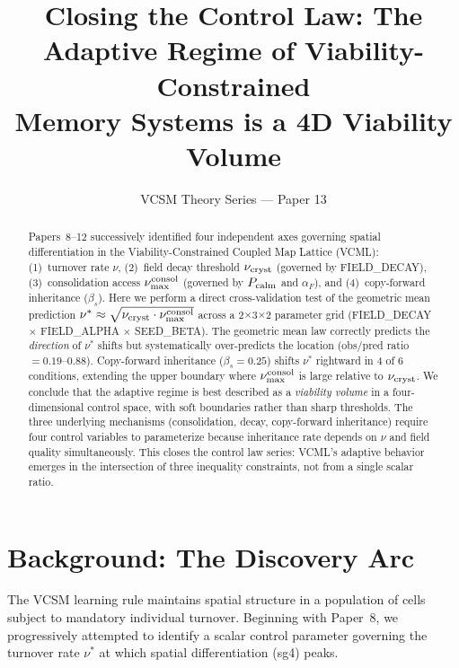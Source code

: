 \documentclass[11pt]{article}
\title{Closing the Control Law: The Adaptive Regime of Viability-Constrained\\
       Memory Systems is a 4D Viability Volume}
\author{VCSM Theory Series --- Paper 13}
\date{}
\begin{document}
\maketitle

\begin{abstract}
Papers~8--12 successively identified four independent axes governing spatial
differentiation in the Viability-Constrained Coupled Map Lattice (VCML):
(1)~turnover rate $\nu$, (2)~field decay threshold $\nu_{\rm cryst}$
(governed by FIELD\_DECAY), (3)~consolidation access $\nu_{\rm max}^{\rm
consol}$ (governed by $P_{\rm calm}$ and $\alpha_F$), and (4)~copy-forward
inheritance ($\beta_s$). Here we perform a direct cross-validation test of
the geometric mean prediction $\nu^* \approx \sqrt{\nu_{\rm cryst} \cdot
\nu_{\rm max}^{\rm consol}}$ across a 2$\times$3$\times$2 parameter grid
(FIELD\_DECAY $\times$ FIELD\_ALPHA $\times$ SEED\_BETA). The geometric mean
law correctly predicts the \emph{direction} of $\nu^*$ shifts but
systematically over-predicts the location (obs/pred ratio $= 0.19$--$0.88$).
Copy-forward inheritance ($\beta_s=0.25$) shifts $\nu^*$ rightward in 4 of 6
conditions, extending the upper boundary where $\nu_{\rm max}^{\rm consol}$
is large relative to $\nu_{\rm cryst}$. We conclude that the adaptive regime
is best described as a \emph{viability volume} in a four-dimensional control
space, with soft boundaries rather than sharp thresholds. The three underlying
mechanisms (consolidation, decay, copy-forward inheritance) require four
control variables to parameterize because inheritance rate depends on $\nu$
and field quality simultaneously. This closes the control law series: VCML's
adaptive behavior emerges in the intersection of three inequality constraints,
not from a single scalar ratio.
\end{abstract}

\section{Background: The Discovery Arc}

The VCSM learning rule maintains spatial structure in a population of cells
subject to mandatory individual turnover. Beginning with Paper~8, we
progressively attempted to identify a scalar control parameter governing the
turnover rate $\nu^*$ at which spatial differentiation (sg4) peaks.
\end{document}
